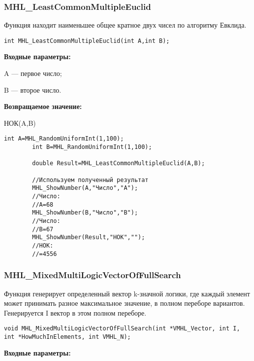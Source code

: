 \documentclass[a4paper,12pt]{article}
\begin{document}
\subsubsection{MHL\_LeastCommonMultipleEuclid}\label{MHL_LeastCommonMultipleEuclid}

Функция находит наименьшее общее кратное двух чисел по алгоритму Евклида.


\begin{lstlisting}[label=code_syntax_MHL_LeastCommonMultipleEuclid,caption=Синтаксис]
int MHL_LeastCommonMultipleEuclid(int A,int B);
\end{lstlisting}

\textbf{Входные параметры:}  
 
A --- первое число;
 
B --- второе число.

\textbf{Возвращаемое значение:}
 
 НОК(A,B)


\begin{lstlisting}[label=code_use_MHL_LeastCommonMultipleEuclid,caption=Пример использования]
        int A=MHL_RandomUniformInt(1,100);
        int B=MHL_RandomUniformInt(1,100);

        double Result=MHL_LeastCommonMultipleEuclid(A,B);

        //Используем полученный результат
        MHL_ShowNumber(A,"Число","A");
        //Число:
        //A=68
        MHL_ShowNumber(B,"Число","B");
        //Число:
        //B=67
        MHL_ShowNumber(Result,"НОК","");
        //НОК:
        //=4556
\end{lstlisting}

\subsubsection{MHL\_MixedMultiLogicVectorOfFullSearch}\label{MHL_MixedMultiLogicVectorOfFullSearch}

Функция генерирует определенный вектор k-значной логики, где каждый элемент может принимать разное максимальное значение, в полном переборе вариантов. Генерируется I вектор в этом полном переборе.


\begin{lstlisting}[label=code_syntax_MHL_MixedMultiLogicVectorOfFullSearch,caption=Синтаксис]
void MHL_MixedMultiLogicVectorOfFullSearch(int *VMHL_Vector, int I, int *HowMuchInElements, int VMHL_N);
\end{lstlisting}

\textbf{Входные параметры:}
\end{document}
